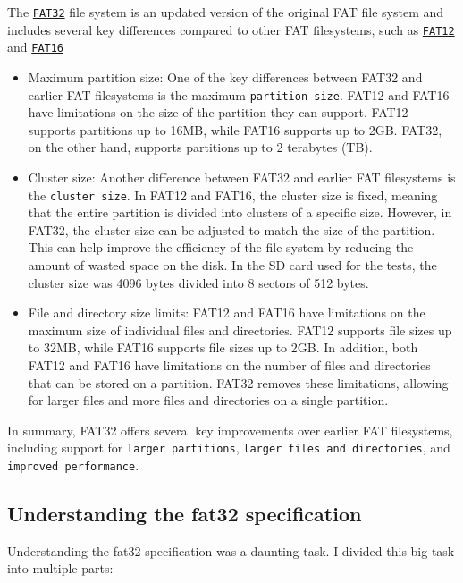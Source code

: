 The \href{https://fr.wikipedia.org/wiki/FAT32}{\texttt{FAT32}} file system is an updated version of the original FAT file system and includes several key differences compared to other FAT filesystems, such as \href{https://fr.wikipedia.org/wiki/FAT12}{\texttt{FAT12}} and \href{https://fr.wikipedia.org/wiki/FAT16}{\texttt{FAT16}}
\begin{itemize}
    \item Maximum partition size: One of the key differences between FAT32 and earlier FAT filesystems is the maximum \texttt{partition size}. FAT12 and FAT16 have limitations on the size of the partition they can support. FAT12 supports partitions up to 16MB, while FAT16 supports up to 2GB. FAT32, on the other hand, supports partitions up to 2 terabytes (TB). 
    \item Cluster size: Another difference between FAT32 and earlier FAT filesystems is the  \texttt{cluster size}. In FAT12 and FAT16, the cluster size is fixed, meaning that the entire partition is divided into clusters of a specific size. However, in FAT32, the cluster size can be adjusted to match the size of the partition. This can help improve the efficiency of the file system by reducing the amount of wasted space on the disk. In the SD card used for the tests, the cluster size was 4096 bytes divided into 8 sectors of 512 bytes.
    \item File and directory size limits: FAT12 and FAT16 have limitations on the maximum size of individual files and directories. FAT12 supports file sizes up to 32MB, while FAT16 supports file sizes up to 2GB. In addition, both FAT12 and FAT16 have limitations on the number of files and directories that can be stored on a partition. FAT32 removes these limitations, allowing for larger files and more files and directories on a single partition.
\end{itemize}
    
In summary, FAT32 offers several key improvements over earlier FAT filesystems, including support for \texttt{larger partitions}, \texttt{larger files and directories}, and \texttt{improved performance}.

\subsection{Understanding the fat32 specification}

Understanding the fat32 specification was a daunting task. I divided this big task into multiple parts:

